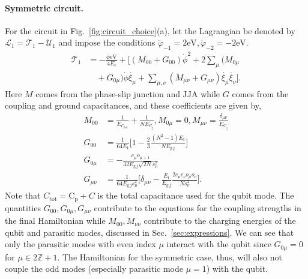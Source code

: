 \documentclass[%
reprint,
superscriptaddress,
 amsmath,amssymb,
 aps,
 prx,
longbibliography,
floatfix,
]{revtex4-2}
\begin{document}
\paragraph{Symmetric circuit.} For the circuit in Fig.~\ref{fig:circuit_choice}(a), let the Lagrangian be denoted by $\mathcal{L}_1=\mathcal{T}_1-\mathcal{U}_1$ and impose the conditions $\dot{\varphi}_{-1}=2\textrm{eV},\dot{\varphi}_{-2}=-2\textrm{eV}$.
    \begin{align}
\mathcal{T}_1&=-\frac{\dot{\phi}\textrm{eV}}{4E_{\textrm{c}}}+\Big[(M_{00}+G_{00})\dot{\phi}^2+2\sum_{\mu}(M_{0\mu}\nonumber\\&\quad+G_{0\mu})\dot{\phi}\dot{\xi_\mu}+\sum_{\mu,\nu}(M_{\mu\nu}+G_{\mu\nu})\dot{\xi_\mu}\dot{\xi_\nu}\Big].\end{align}
Here $M$ comes from the phase-slip junction and JJA while $G$ comes from the coupling and ground capacitances, and these coefficients are given by,
\begin{align}
M_{00}&=\frac{1}{E_{C_\textrm{tot}}}+\frac{1}{NE_{\textrm{C}_\textrm{j}}}, M_{0\mu}=0,    M_{\mu\nu}=\frac{\delta_{\mu\nu}}{E_{\textrm{C}_\textrm{j}}}\\
G_{00}&=\frac{1}{64E_{\textrm{t}}}\Big[1-\frac{2}{3}\frac{(N^2-1)E_\textrm{t}}{NE_\textrm{g,j}}\Big]\\
G_{0\mu}&=-\frac{c_\mu o_{\mu+1}}{32E_{\textrm{g,j}}\sqrt{2N}s_\mu^2}\\
G_{\mu\nu}&=\frac{1}{64E_{\textrm{g,j}}s_\mu^2}\Big[\delta_{\mu\nu}-\frac{E_{\textrm{t}}}{E_{\textrm{g,j}}}\frac{2c_\mu c_\nu o_\mu o_\nu}{N s_\nu^2}\Big].
\end{align}
Note that $C_\textrm{tot}=\textrm{C}_\textrm{p}+C$ is the total capacitance used for the qubit mode. The quantities $G_{00},G_{0\mu},G_{\mu\nu}$ contribute to the equations for the coupling strengths in the final Hamiltonian while $M_{00},M_{\nu\nu}$ contribute to the charging energies of the qubit and parasitic modes, discussed in Sec.~\ref{sec:expressions}. We can see that only the parasitic modes with even index $\mu$ interact with the qubit since $G_{0\mu}=0$ for $\mu\in 2\mathbb{Z}+1$. The Hamiltonian for the symmetric case, thus, will also not couple the odd modes (especially  parasitic mode $\mu=1$) with the qubit. 
\end{document}
